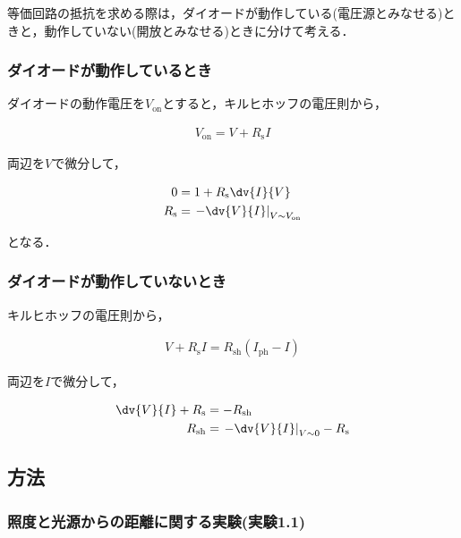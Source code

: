 \documentclass[1_power_supply.tex]{subfiles}
\begin{document}
等価回路の抵抗を求める際は，ダイオードが動作している(電圧源とみなせる)ときと，動作していない(開放とみなせる)ときに分けて考える．

\subsubsection{ダイオードが動作しているとき}

ダイオードの動作電圧を$V_\mathrm{on}$とすると，キルヒホッフの電圧則から，

\begin{align}
	V_\mathrm{on} = V+R_\mathrm{s}I
\end{align}

両辺を$V$で微分して，

\begin{align}
	0            & = 1+R_\mathrm{s}\dv{I}{V}                                       \\
	R_\mathrm{s} & = \left.- \dv{V}{I}\right|_{V\sim V_\mathrm{on}} \label{eq:R_s}
\end{align}

となる．

\subsubsection{ダイオードが動作していないとき}

キルヒホッフの電圧則から，

\begin{align}
	V+R_\mathrm{s}I = R_\mathrm{sh}(I_\mathrm{ph}-I)
\end{align}

両辺を$I$で微分して，

\begin{align}
	\dv{V}{I}+R_\mathrm{s} & = -R_\mathrm{sh}                                                 \\
	R_\mathrm{sh}          & = \left.-\dv{V}{I}\right|_{V\sim 0}-R_\mathrm{s} \label{eq:R_sh}
\end{align}

\subsection{方法}

\subsubsection{照度と光源からの距離に関する実験(実験1.1)}
\end{document}

